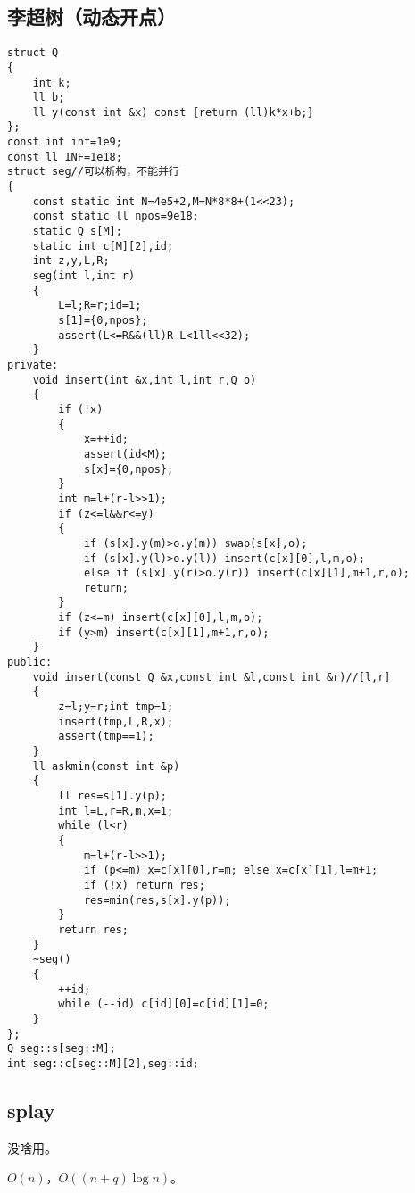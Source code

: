 \documentclass[12pt]{ctexart}
\begin{document}
\subsection{李超树（动态开点）}
\begin{lstlisting}
struct Q
{
	int k;
	ll b;
	ll y(const int &x) const {return (ll)k*x+b;}
};
const int inf=1e9;
const ll INF=1e18;
struct seg//可以析构，不能并行
{
	const static int N=4e5+2,M=N*8*8+(1<<23);
	const static ll npos=9e18;
	static Q s[M];
	static int c[M][2],id;
	int z,y,L,R;
	seg(int l,int r)
	{
		L=l;R=r;id=1;
		s[1]={0,npos};
		assert(L<=R&&(ll)R-L<1ll<<32);
	}
private:
	void insert(int &x,int l,int r,Q o)
	{
		if (!x)
		{
			x=++id;
			assert(id<M);
			s[x]={0,npos};
		}
		int m=l+(r-l>>1);
		if (z<=l&&r<=y)
		{
			if (s[x].y(m)>o.y(m)) swap(s[x],o);
			if (s[x].y(l)>o.y(l)) insert(c[x][0],l,m,o);
			else if (s[x].y(r)>o.y(r)) insert(c[x][1],m+1,r,o);
			return;
		}
		if (z<=m) insert(c[x][0],l,m,o);
		if (y>m) insert(c[x][1],m+1,r,o);
	}
public:
	void insert(const Q &x,const int &l,const int &r)//[l,r]
	{
		z=l;y=r;int tmp=1;
		insert(tmp,L,R,x);
		assert(tmp==1);
	}
	ll askmin(const int &p)
	{
		ll res=s[1].y(p);
		int l=L,r=R,m,x=1;
		while (l<r)
		{
			m=l+(r-l>>1);
			if (p<=m) x=c[x][0],r=m; else x=c[x][1],l=m+1;
			if (!x) return res;
			res=min(res,s[x].y(p));
		}
		return res;
	}
	~seg()
	{
		++id;
		while (--id) c[id][0]=c[id][1]=0;
	}
};
Q seg::s[seg::M];
int seg::c[seg::M][2],seg::id;
\end{lstlisting}

\subsection{splay}

没啥用。

$O(n)$，$O((n+q)\log n)$。
\end{document}
